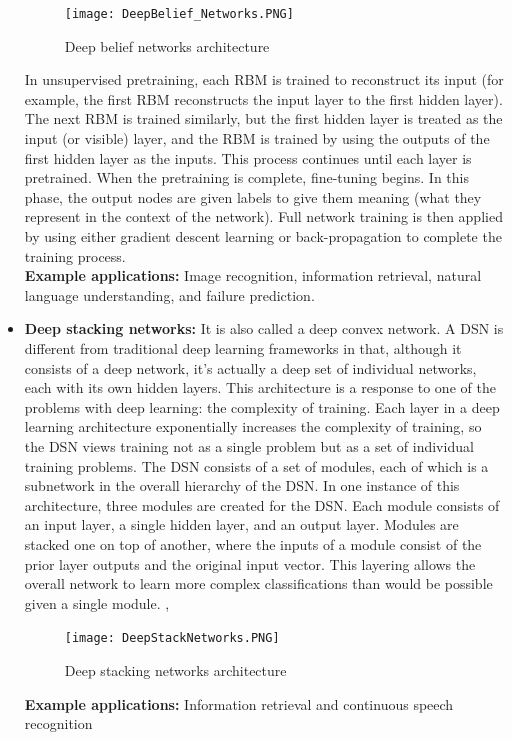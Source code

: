 \begin{itemize}
    \begin{figure}[H]
        \centering
        \texttt{[image: DeepBelief\_Networks.PNG]}
        \caption{Deep belief networks architecture}
        \label{fig:Deep belief networks}
    \end{figure}
    In unsupervised pretraining, each RBM is trained to reconstruct its input (for example, the first RBM reconstructs the input layer to the first hidden layer). The next RBM is trained similarly, but the first hidden layer is treated as the input (or visible) layer, and the RBM is trained by using the outputs of the first hidden layer as the inputs. This process continues until each layer is pretrained. When the pretraining is complete, fine-tuning begins. In this phase, the output nodes are given labels to give them meaning (what they represent in the context of the network). Full network training is then applied by using either gradient descent learning or back-propagation to complete the training process. \\
    \textbf{Example applications: }Image recognition, information retrieval, natural language understanding, and failure prediction. \\
    \item \textbf{Deep stacking networks: } It is also called a deep convex network. A DSN is different from traditional deep learning frameworks in that, although it consists of a deep network, it's actually a deep set of individual networks, each with its own hidden layers.
    This architecture is a response to one of the problems with deep learning: the complexity of training. Each layer in a deep learning architecture exponentially increases the complexity of training, so the DSN views training not as a single problem but as a set of individual training problems.
    The DSN consists of a set of modules, each of which is a subnetwork in the overall hierarchy of the DSN. In one instance of this architecture, three modules are created for the DSN. Each module consists of an input layer, a single hidden layer, and an output layer. Modules are stacked one on top of another, where the inputs of a module consist of the prior layer outputs and the original input vector. This layering allows the overall network to learn more complex classifications than would be possible given a single module. \cite{deng2014tutorial}, \cite{madhavan2017deep}
    
    \begin{figure}[H]
        \centering
        \texttt{[image: DeepStackNetworks.PNG]}
        \caption{Deep stacking networks architecture}
        \label{fig:Deep stacking networks}
    \end{figure}
    \textbf{Example applications:} Information retrieval and continuous speech recognition
    

\end{itemize}
